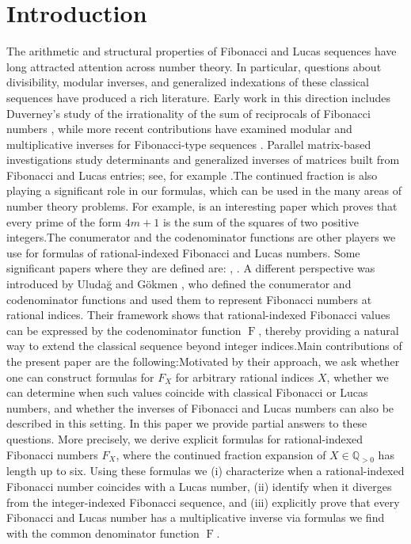 \documentclass[11pt,reqno]{amsart}
\numberwithin{equation}{section}
\numberwithin{table}{section}
\numberwithin{figure}{section}
\DeclareMathOperator{\F}{F}
\theoremstyle{plain}
\theoremstyle{definition}
\theoremstyle{remark}
\begin{document}
\section{Introduction}The arithmetic and structural properties of Fibonacci and Lucas sequences have long attracted attention across number theory. In particular, questions about divisibility, modular inverses, and generalized indexations of these classical sequences have produced a rich literature. Early work in this direction includes Duverney’s study of the irrationality of the sum of reciprocals of Fibonacci numbers \cite{duverney1997irrationalite}, while more recent contributions have examined modular and multiplicative inverses for Fibonacci-type sequences \cite{sanna2023inverse,song2019modular}. Parallel matrix-based investigations study determinants and generalized inverses of matrices built from Fibonacci and Lucas entries; see, for example \cite{shen2011determinants, shen2016moore}.The continued fraction is also playing a significant role in our formulas, which can be used in the many areas of number theory problems. For example, \cite{benjamin2005pythagorean} is an interesting paper which proves that every prime of the form $4m+1$ is the sum of the squares of two positive integers.The conumerator and the codenominator functions are other players we use for formulas of rational-indexed Fibonacci and Lucas numbers. Some significant papers where they are defined are: \cite{ULUDAG2022103192}, \cite{uludaug2022quantizations}. A different perspective was introduced by Uludağ and Gökmen \cite{ULUDAG2022103192}, who defined the conumerator and codenominator functions and used them to represent Fibonacci numbers at rational indices. Their framework shows that rational-indexed Fibonacci values can be expressed by the codenominator function $\F$, thereby providing a natural way to extend the classical sequence beyond integer indices.Main contributions of the present paper are the following:Motivated by their approach, we ask whether one can construct formulas for $F_X$ for arbitrary rational indices $X$, whether we can determine when such values coincide with classical Fibonacci or Lucas numbers, and whether the inverses of Fibonacci and Lucas numbers can also be described in this setting. In this paper we provide partial answers to these questions. More precisely, we derive explicit formulas for rational-indexed Fibonacci numbers $F_X$, where the continued fraction expansion of $X \in \mathbb{Q}_{>0}$ has length up to six. Using these formulas we (i) characterize when a rational-indexed Fibonacci number coincides with a Lucas number, (ii) identify when it diverges from the integer-indexed Fibonacci sequence, and (iii) explicitly prove that every Fibonacci and Lucas number has a multiplicative inverse via formulas we find with the common denominator function $\F$.
\end{document}
